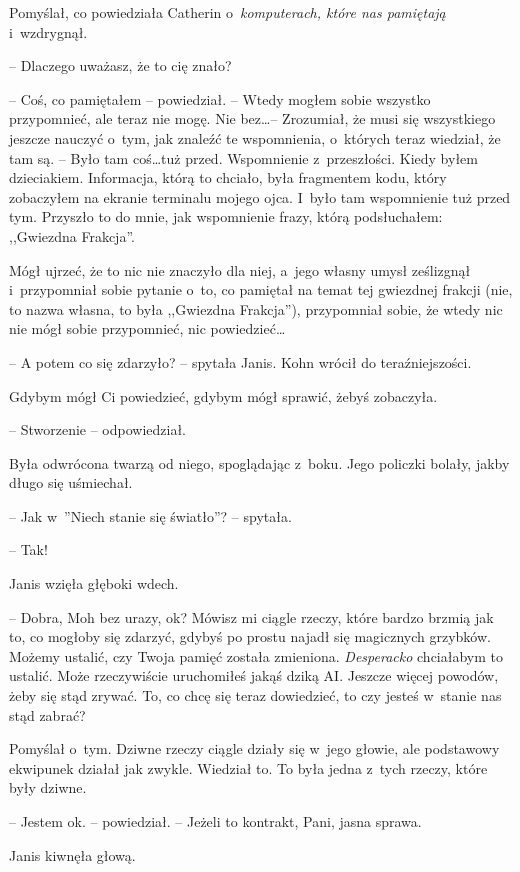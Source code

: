 \documentclass[oneside,polish,11pt,sfheadings]{mwbk}
\begin{document}
Pomyślał, co powiedziała Catherin o~\emph{komputerach, które nas
pamiętają} i~wzdrygnął.

-- Dlaczego uważasz, że to cię znało?

-- Coś, co pamiętałem -- powiedział. -- Wtedy mogłem sobie wszystko
przypomnieć, ale teraz nie mogę. Nie bez\ldots -- Zrozumiał, że musi się
wszystkiego jeszcze nauczyć o~tym, jak znaleźć te wspomnienia, o~których
teraz wiedział, że tam są. -- Było tam coś\ldots tuż przed. Wspomnienie z~przeszłości. Kiedy byłem dzieciakiem. Informacja, którą to chciało, była
fragmentem kodu, który zobaczyłem na ekranie terminalu mojego ojca. I~było tam wspomnienie tuż przed tym. Przyszło to do mnie, jak wspomnienie
frazy, którą podsłuchałem: ,,Gwiezdna Frakcja''.

Mógł ujrzeć, że to nic nie znaczyło dla niej, a~jego własny umysł
ześlizgnął i~przypomniał sobie pytanie o~to, co pamiętał na temat tej
gwiezdnej frakcji (nie, to nazwa własna, to była ,,Gwiezdna Frakcja''),
przypomniał sobie, że wtedy nic nie mógł sobie przypomnieć, nic
powiedzieć\ldots

-- A potem co się zdarzyło? -- spytała Janis. Kohn wrócił do
teraźniejszości.

Gdybym mógł Ci powiedzieć, gdybym mógł sprawić, żebyś zobaczyła.

-- Stworzenie -- odpowiedział.

Była odwrócona twarzą od niego, spoglądając z~boku. Jego policzki
bolały, jakby długo się uśmiechał.

-- Jak w~''Niech stanie się światło''? -- spytała.

-- Tak!

Janis wzięła głęboki wdech. 

-- Dobra, Moh bez urazy, ok? Mówisz mi ciągle
rzeczy, które bardzo brzmią jak to, co mogłoby się zdarzyć, gdybyś po
prostu najadł się magicznych grzybków. Możemy ustalić, czy Twoja pamięć
została zmieniona. \emph{Desperacko} chciałabym to ustalić. Może
rzeczywiście uruchomiłeś jakąś dziką AI. Jeszcze więcej powodów, żeby
się stąd zrywać. To, co chcę się teraz dowiedzieć, to czy jesteś w~stanie nas stąd zabrać?

Pomyślał o~tym. Dziwne rzeczy ciągle działy się w~jego głowie, ale
podstawowy ekwipunek działał jak zwykle. Wiedział to. To była jedna z~tych rzeczy, które były dziwne.

-- Jestem ok. -- powiedział. -- Jeżeli to kontrakt, Pani, jasna sprawa.

Janis kiwnęła głową.
\end{document}

